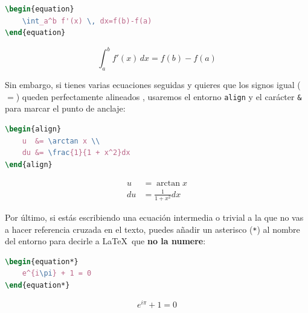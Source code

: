\begin{minipage}[c]{.5\textwidth}
\begin{lstlisting}[language=tex]
\begin{equation}
    \int_a^b f'(x) \, dx=f(b)-f(a)
\end{equation}
\end{lstlisting}
\end{minipage}%
\begin{minipage}[c]{.5\textwidth}
\begin{equation}
    \int_a^b f'(x) \, dx=f(b)-f(a)
\end{equation}
\end{minipage}

Sin embargo, si tienes varias ecuaciones seguidas y quieres que los signos igual ($=$) queden perfectamente alineados , usaremos el entorno \texttt{align} y el carácter \texttt{\&} para marcar el punto de anclaje:

\begin{minipage}[c]{.5\textwidth}
\begin{lstlisting}[language=tex]
\begin{align}
    u  &= \arctan x \\
    du &= \frac{1}{1 + x^2}dx
\end{align}
\end{lstlisting}
\end{minipage}%
\begin{minipage}[c]{.5\textwidth}
\begin{align}
    u  &= \arctan x \\
    du &= \frac{1}{1 + x^2}dx
\end{align}
\end{minipage}

Por último, si estás escribiendo una ecuación intermedia o trivial a la que no vas a hacer referencia cruzada en el texto, puedes añadir un asterisco (\texttt{*}) al nombre del entorno para decirle a \LaTeX\ que \textbf{no la numere}:

\begin{minipage}[c]{.5\textwidth}
\begin{lstlisting}[language=tex]
\begin{equation*}
    e^{i\pi} + 1 = 0
\end{equation*}
\end{lstlisting}
\end{minipage}%
\begin{minipage}[c]{.5\textwidth}
\begin{equation*}
    e^{i\pi} + 1 = 0
\end{equation*}
\end{minipage}

